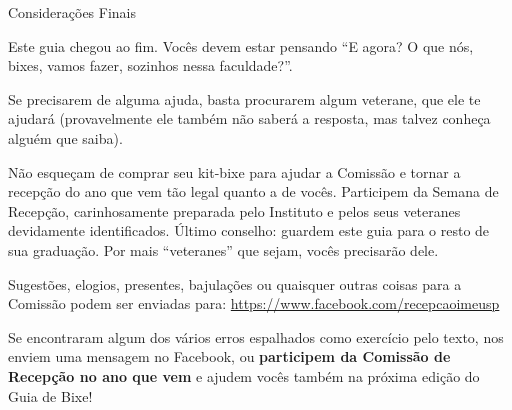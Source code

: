 \begin{secao}{Considerações Finais}

Este guia chegou ao fim. Vocês devem estar pensando ``E agora? O que nós, bixes,
vamos fazer, sozinhos nessa faculdade?''.

Se precisarem de alguma ajuda, basta procurarem algum veterane, que ele te
ajudará (provavelmente ele também não saberá a resposta, mas talvez conheça
alguém que saiba).

Não esqueçam de comprar seu kit-bixe para ajudar a Comissão e tornar a recepção
do ano que vem tão legal quanto a de vocês. Participem da Semana de Recepção,
carinhosamente preparada pelo Instituto e pelos seus veteranes devidamente
identificados. Último conselho: guardem este guia para o resto de sua graduação.
Por mais ``veteranes'' que sejam, vocês precisarão dele.

Sugestões, elogios, presentes, bajulações ou quaisquer outras coisas para a
Comissão podem ser enviadas para: \url{https://www.facebook.com/recepcaoimeusp}

Se encontraram algum dos vários erros espalhados como exercício pelo texto,
nos enviem uma mensagem no Facebook, ou \textbf{participem da Comissão de Recepção 
no ano que vem} e ajudem vocês também na próxima edição do Guia de Bixe!

\end{secao}
